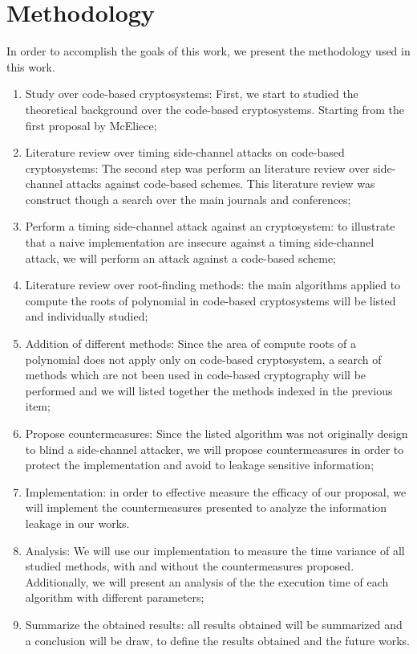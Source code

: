 \section{Methodology}
In order to accomplish the goals of this work, we present the methodology used in this work.
\begin{enumerate}
    \item Study over code-based cryptosystems: First, we start to studied the theoretical background over the code-based cryptosystems. Starting from the first proposal by McEliece;
    \item Literature review over timing side-channel attacks on code-based cryptosystems: The second step was perform an literature review over side-channel attacks against code-based schemes. This literature review was construct though a search over the main journals and conferences;
    \item Perform a timing side-channel attack against an cryptosystem: to illustrate that a naive implementation are insecure against a timing side-channel attack, we will perform an attack against a code-based scheme;
    \item Literature review over root-finding methods: the main algorithms applied to compute the roots of polynomial in code-based cryptosystems will be listed and individually studied; 
    \item Addition of different methods: Since the area of compute roots of a polynomial does not apply only on code-based cryptosystem, a search of methods which are not been used in code-based cryptography will be performed and we will listed together the methods indexed in the previous item;
    \item Propose countermeasures: Since the listed algorithm was not originally design to blind a side-channel attacker, we will propose countermeasures in order to protect the implementation and avoid to leakage sensitive information;
    \item Implementation: in order to effective measure the efficacy of our proposal, we will implement the countermeasures presented to analyze the information leakage in our works.
    \item Analysis: We will use our implementation to measure the time variance of all studied methods, with and without the countermeasures proposed. Additionally, we will present an analysis of the the execution time of each algorithm with different parameters;
    \item Summarize the obtained results: all results obtained will be summarized and a conclusion will be draw, to define the results obtained and the future works.
\end{enumerate}

